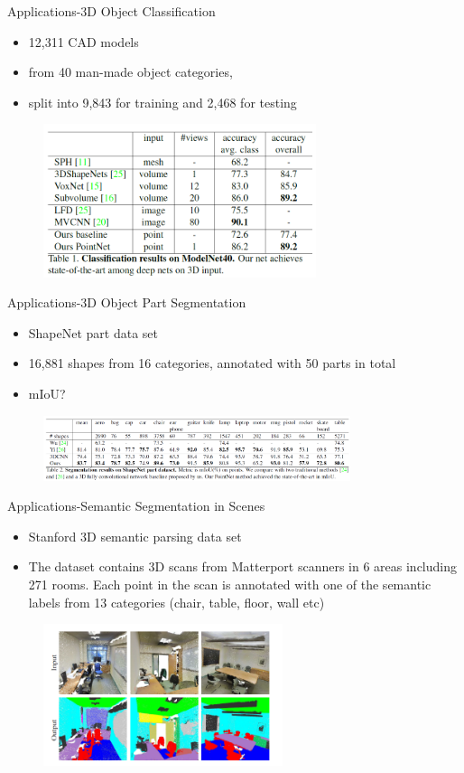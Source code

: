\documentclass[serif,mathserif]{beamer}
\begin{document}
\begin{frame}{Applications-3D Object Classification}
	\begin{itemize}
		\item 12,311 CAD models
		\item from 40 man-made object categories, 
		\item split into 9,843 for training and 2,468 for testing
	\end{itemize}
	\begin{figure}
		\includegraphics[width=8cm]{image/application.png}
	\end{figure}
\end{frame}

\begin{frame}{Applications-3D Object Part Segmentation }
	\begin{itemize}
		\item ShapeNet part data set
		\item 16,881 shapes from 16 categories, annotated with 50 parts in total
		\item mIoU?
	\end{itemize}
	\begin{figure}
		\includegraphics[width=9cm]{image/seg.png}
	\end{figure}
\end{frame}

\begin{frame}{Applications-Semantic Segmentation in Scenes }
	\begin{itemize}
		\item Stanford 3D semantic parsing data set
		\item The dataset contains 3D scans from Matterport scanners in 6 areas including 271 rooms. Each point in the scan is annotated with one of the semantic labels from 13 categories (chair, table, floor, wall etc)
	\end{itemize}
	\begin{figure}
		\includegraphics[width=7cm]{image/sematic.png}
	\end{figure}
\end{frame}
\end{document}
